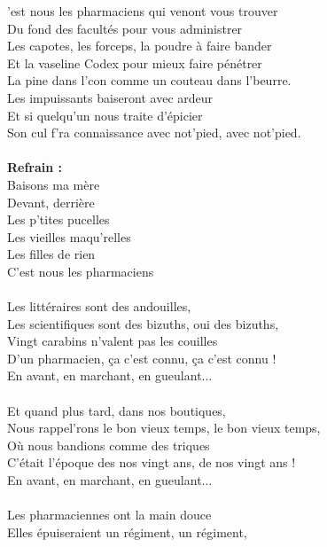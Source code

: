 
'est nous les pharmaciens qui venont vous trouver
\\Du fond des facultés pour vous administrer
\\Les capotes, les forceps, la poudre à faire bander
\\Et la vaseline Codex pour mieux faire pénétrer
\\La pine dans l'con comme un couteau dans l'beurre.
\\Les impuissants baiseront avec ardeur
\\Et si quelqu'un nous traite d'épicier
\\Son cul f'ra connaissance avec not'pied, avec not'pied.
\\\\\textbf{Refrain :}
\\Baisons ma mère
\\Devant, derrière
\\Les p'tites pucelles
\\Les vieilles maqu'relles
\\Les filles de rien
\\C'est nous les pharmaciens
\\\\Les littéraires sont des andouilles,
\\Les scientifiques sont des bizuths, oui des bizuths,
\\Vingt carabins n'valent pas les couilles
\\D'un pharmacien, ça c'est connu, ça c'est connu !
\\En avant, en marchant, en gueulant...
\\\\Et quand plus tard, dans nos boutiques,
\\Nous rappel'rons le bon vieux temps, le bon vieux temps,
\\Où nous bandions comme des triques
\\C'était l'époque des nos vingt ans, de nos vingt ans !
\\En avant, en marchant, en gueulant...
\\\\Les pharmaciennes ont la main douce
\\Elles épuiseraient un régiment, un régiment,
